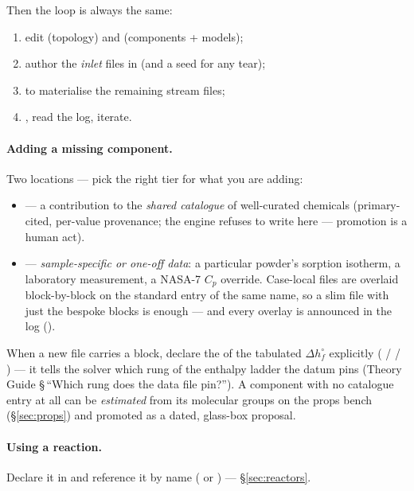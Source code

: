 \documentclass[11pt,a4paper]{article}
\begin{document}
Then the loop is always the same:

\begin{enumerate}[leftmargin=*,nosep,topsep=2pt]
  \item edit  (topology) and
         (components + models);
  \item author the \emph{inlet} files in  (and a seed for any
        tear);
  \item {} to materialise the remaining
        stream files;
  \item {}, read the log, iterate.
\end{enumerate}

\paragraph{Adding a missing component.}  Two locations --- pick the
right tier for what you are adding:

\begin{itemize}[leftmargin=*]
  \item {} --- a contribution
        to the \emph{shared catalogue} of well-curated chemicals
        (primary-cited, per-value provenance; the engine refuses to
        write here --- promotion is a human act).
  \item {} ---
        \emph{sample-specific or one-off data}: a particular powder's
        sorption isotherm, a laboratory measurement, a NASA-7 $C_p$
        override.  Case-local files are overlaid block-by-block on the
        standard entry of the same name, so a slim file with just the
        bespoke blocks is enough --- and every overlay is announced in
        the log ().
\end{itemize}

When a new file carries a  block, declare the
 of the tabulated $\Delta h^\circ_f$ explicitly
( /  / ) --- it tells the solver
which rung of the enthalpy ladder the datum pins (Theory Guide
\S\,``Which rung does the data file pin?'').  A component with no
catalogue entry at all can be \emph{estimated} from its molecular
groups on the props bench (\S\ref{sec:props}) and promoted as a dated,
glass-box proposal.

\paragraph{Using a reaction.}  Declare it in 
and reference it by name ( or
) --- \S\ref{sec:reactors}.
\end{document}
